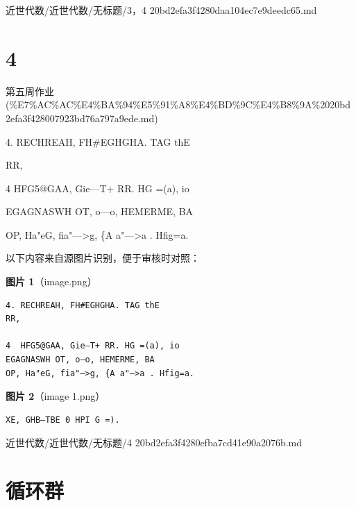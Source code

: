 \begin{note}[来源路径]

近世代数/近世代数/无标题/3，4 20bd2efa3f4280daa104ec7e9deedc65.md

\end{note}

\section*{4}

\begin{note}[来源上级主题]

第五周作业 (\%E7\%AC\%AC\%E4\%BA\%94\%E5\%91\%A8\%E4\%BD\%9C\%E4\%B8\%9A\%2020bd2efa3f428007923bd76a797a9ede.md)

\end{note}

\begin{homework}

4. RECHREAH, FH\#EGHGHA. TAG thE

RR,

4  HFG5@GAA, Gie—T+ RR. HG =(a), io

EGAGNASWH OT, o—o, HEMERME, BA

OP, Ha"eG, fia"—>g, \{A a"—>a . Hfig=a.

\end{homework}

\begin{note}
以下内容来自源图片识别，便于审核时对照：

\textbf{图片 1}（image.png）
\begin{Verbatim}[fontsize=\small]
4. RECHREAH, FH#EGHGHA. TAG thE
RR,

4  HFG5@GAA, Gie—T+ RR. HG =(a), io
EGAGNASWH OT, o—o, HEMERME, BA
OP, Ha"eG, fia"—>g, {A a"—>a . Hfig=a.
\end{Verbatim}

\textbf{图片 2}（image 1.png）
\begin{Verbatim}[fontsize=\small]
XE, GHB—TBE 0 HPI G =).
\end{Verbatim}

\end{note}

\begin{note}[来源路径]

近世代数/近世代数/无标题/4 20bd2efa3f4280efba7cd41e90a2076b.md

\end{note}

\section*{循环群}


